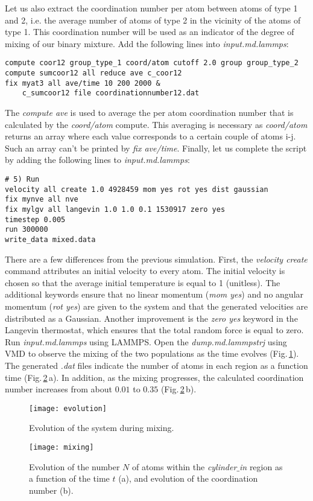 Let us also extract the coordination number per atom between atoms of type 1 and 2, i.e. the average number of atoms of type 2 in the vicinity of the atoms of type 1. This coordination number will be used as an indicator of the degree of mixing of our binary mixture. Add the following lines into \textit{input.md.lammps}:
\begin{verbatim}
compute coor12 group_type_1 coord/atom cutoff 2.0 group group_type_2
compute sumcoor12 all reduce ave c_coor12
fix myat3 all ave/time 10 200 2000 &
    c_sumcoor12 file coordinationnumber12.dat
\end{verbatim}
The \textit{compute ave} is used to average the per atom coordination number that is calculated by the \textit{coord/atom} compute. This averaging is necessary as \textit{coord/atom} returns an array where each value corresponds to a certain couple of atoms i-j. Such an array can't be printed by \textit{fix ave/time}. Finally, let us complete the script by adding the following lines to \textit{input.md.lammps}:
\begin{verbatim}
# 5) Run
velocity all create 1.0 4928459 mom yes rot yes dist gaussian
fix mynve all nve
fix mylgv all langevin 1.0 1.0 0.1 1530917 zero yes
timestep 0.005
run 300000
write_data mixed.data
\end{verbatim}
There are a few differences from the previous simulation. First, the \textit{velocity create} command attributes an initial velocity to every atom.
The initial velocity is chosen so that the average initial temperature is equal to 1 (unitless). The additional keywords ensure that no linear momentum (\textit{mom yes}) and no angular momentum (\textit{rot yes}) are given to the system and that the generated velocities are distributed as a Gaussian. Another improvement is the \textit{zero yes} keyword in the Langevin thermostat, which ensures that the total random force is equal to zero.
Run \textit{input.md.lammps} using LAMMPS. Open the \textit{dump.md.lammpstrj} using VMD to observe the mixing of the two populations as the time evolves (Fig.\,\ref{fig:evolution-population}). The generated \textit{.dat} files indicate the number of atoms in each region as a function time (Fig.\,\ref{fig:mixing}\,a). In addition, as the mixing progresses, the calculated coordination number increases from about $0.01$ to $0.35$ (Fig.\,\ref{fig:mixing}\,b).

\begin{figure}
\centering
\texttt{[image: evolution]}
\caption{Evolution of the system during mixing.}
\label{fig:evolution-population}
\end{figure}

\begin{figure}
\centering
\texttt{[image: mixing]}
\caption{Evolution of the number $N$ of atoms within the \textit{cylinder$\_$in} region as a function of the time $t$ (a),
and evolution of the coordination number (b).}
\label{fig:mixing}
\end{figure}

